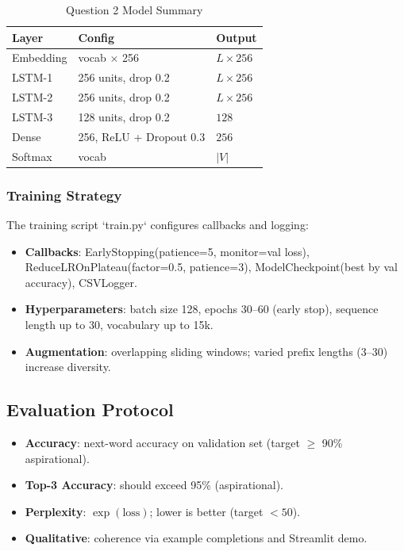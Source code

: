 \documentclass[12pt,a4paper]{article}
\begin{document}
\begin{table}[H]
\centering
\caption{Question 2 Model Summary}
\begin{tabular}{@{}lll@{}}
\toprule
\textbf{Layer} & \textbf{Config} & \textbf{Output} \\ \midrule
Embedding & vocab $\times$ 256 & $L \times 256$ \\
LSTM-1 & 256 units, drop 0.2 & $L \times 256$ \\
LSTM-2 & 256 units, drop 0.2 & $L \times 256$ \\
LSTM-3 & 128 units, drop 0.2 & $128$ \\
Dense & 256, ReLU + Dropout 0.3 & $256$ \\
Softmax & vocab & $|V|$ \\ \bottomrule
\end{tabular}
\end{table}

\subsubsection{Training Strategy}

The training script `train.py` configures callbacks and logging:
\begin{itemize}
  \item \textbf{Callbacks}: EarlyStopping(patience=5, monitor=val loss), ReduceLROnPlateau(factor=0.5, patience=3), ModelCheckpoint(best by val accuracy), CSVLogger.
  \item \textbf{Hyperparameters}: batch size 128, epochs 30--60 (early stop), sequence length up to 30, vocabulary up to 15k.
  \item \textbf{Augmentation}: overlapping sliding windows; varied prefix lengths (3--30) increase diversity.
\end{itemize}

\subsection{Evaluation Protocol}

\begin{itemize}
  \item \textbf{Accuracy}: next-word accuracy on validation set (target $\geq$ 90\% aspirational).
  \item \textbf{Top-3 Accuracy}: should exceed 95\% (aspirational).
  \item \textbf{Perplexity}: $\exp(\text{loss})$; lower is better (target $<50$).
  \item \textbf{Qualitative}: coherence via example completions and Streamlit demo.
\end{itemize}
\end{document}
